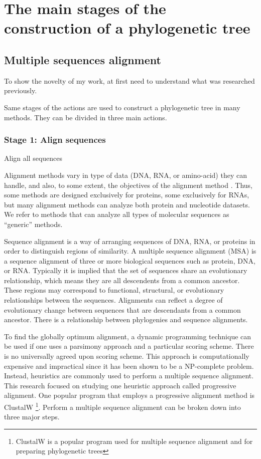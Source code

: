 \chapter{The main stages of the construction of a phylogenetic tree}
\section{Multiple sequences alignment}
To show the novelty of my work, at first need to 
understand what was researched previously.

Same stages of the actions are used to construct a phylogenetic tree in many methods.
They can be divided in three main actions.

\subsection{Stage 1: Align sequences} \label{phase1}

\begin{algorithm}[H]
{
	Align all sequences\;
}
\end{algorithm}


Alignment methods vary in type of data \cite{rporter} (DNA, RNA, or amino-acid)
they can handle, and also, to some extent, the objectives of the alignment method \cite{tandy}.
Thus, some methods are designed exclusively for proteins, some exclusively
for RNAs, but many alignment methods can analyze both protein and nucleotide
datasets. We refer to methods that can analyze all types of molecular sequences as
``generic'' methods.

Sequence alignment is a way of arranging sequences of DNA, RNA, or 
proteins in order to distinguish regions of similarity. A multiple sequence 
alignment (MSA) is a sequence alignment of three or more biological sequences 
such as protein, DNA, or RNA. Typically it is implied that the set of sequences 
share an evolutionary relationship, which means they are all descendents from a 
common ancestor. These regions may correspond to functional, structural, or 
evolutionary relationships between the sequences. Alignments can reflect a degree 
of evolutionary change between sequences that are descendants from a common 
ancestor. There is a relationship between phylogenies and sequence alignments.

To find the globally optimum alignment, a dynamic programming technique 
can be used if one uses a parsimony approach and a particular scoring scheme. 
There is no universally agreed upon scoring scheme. This approach is 
computationally expensive and impractical since it has been shown to be a NP-complete 
problem. Instead, heuristics are commonly used to perform a multiple 
sequence alignment. This research focused on studying one heuristic approach 
called progressive alignment. One popular program that employs a progressive 
alignment method is ClustalW \footnote{ClustalW is a popular 
program used for multiple sequence alignment and for preparing phylogenetic trees}. 
Perform a multiple sequence alignment can be broken down into three major steps.
\nocite{clustalwsite}

